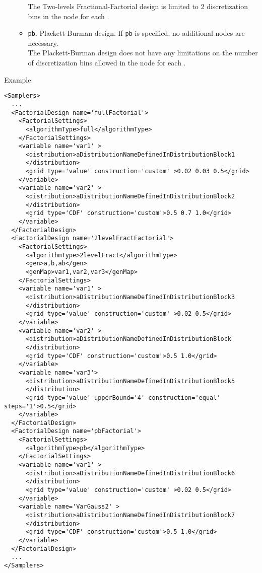 \begin{itemize}
\begin{itemize}
\begin{itemize}
          \end{itemize}
          \nb The Two-levels Fractional-Factorial design is limited to 2
          discretization bins in the  node for each
          .
       \item {}\texttt{pb}. Plackett-Burman design.
         If \texttt{pb} is specified, no additional nodes are necessary.
         \\
         \nb The Plackett-Burman design does not have any limitations on the
         number of discretization bins allowed in the  node for
         each .
      \end{itemize}

  \end{itemize}
Example:
\begin{lstlisting}[style=XML,morekeywords={construction,upperBound,steps}]
<Samplers>
  ...
  <FactorialDesign name='fullFactorial'>
    <FactorialSettings>
      <algorithmType>full</algorithmType>
    </FactorialSettings>
    <variable name='var1' >
      <distribution>aDistributionNameDefinedInDistributionBlock1
      </distribution>
      <grid type='value' construction='custom' >0.02 0.03 0.5</grid>
    </variable>
    <variable name='var2' >
      <distribution>aDistributionNameDefinedInDistributionBlock2
      </distribution>
      <grid type='CDF' construction='custom'>0.5 0.7 1.0</grid>
    </variable>
  </FactorialDesign>
  <FactorialDesign name='2levelFractFactorial'>
    <FactorialSettings>
      <algorithmType>2levelFract</algorithmType>
      <gen>a,b,ab</gen>
      <genMap>var1,var2,var3</genMap>
    </FactorialSettings>
    <variable name='var1' >
      <distribution>aDistributionNameDefinedInDistributionBlock3
      </distribution>
      <grid type='value' construction='custom' >0.02 0.5</grid>
    </variable>
    <variable name='var2' >
      <distribution>aDistributionNameDefinedInDistributionBlock
      </distribution>
      <grid type='CDF' construction='custom'>0.5 1.0</grid>
    </variable>
    <variable name='var3'>
      <distribution>aDistributionNameDefinedInDistributionBlock5
      </distribution>
      <grid type='value' upperBound='4' construction='equal' steps='1'>0.5</grid>
    </variable>
  </FactorialDesign>
  <FactorialDesign name='pbFactorial'>
    <FactorialSettings>
      <algorithmType>pb</algorithmType>
    </FactorialSettings>
    <variable name='var1' >
      <distribution>aDistributionNameDefinedInDistributionBlock6
      </distribution>
      <grid type='value' construction='custom' >0.02 0.5</grid>
    </variable>
    <variable name='VarGauss2' >
      <distribution>aDistributionNameDefinedInDistributionBlock7
      </distribution>
      <grid type='CDF' construction='custom'>0.5 1.0</grid>
    </variable>
  </FactorialDesign>
  ...
</Samplers>
\end{lstlisting}

